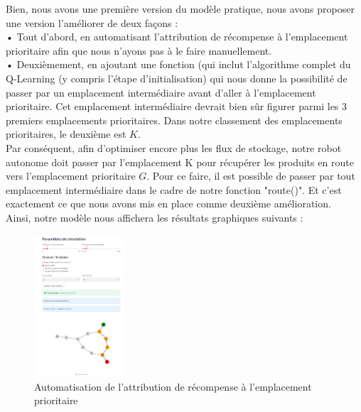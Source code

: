 \documentclass{article}
\begin{document}
Bien, nous avons une première version du modèle pratique, nous avons proposer une version  l'améliorer de deux façons :\\
•	Tout d'abord, en automatisant l'attribution de récompense à l'emplacement prioritaire afin que nous n'ayons pas à le faire manuellement. \\
•	Deuxièmement, en ajoutant une fonction (qui inclut l'algorithme complet du Q-Learning (y compris l'étape d'initialisation) qui nous donne la possibilité de passer
par un emplacement intermédiaire avant d'aller à l'emplacement prioritaire. Cet emplacement intermédiaire devrait bien sûr figurer parmi les 3 premiers emplacements prioritaires. Dans notre classement des emplacements prioritaires, le deuxième est $K$. \\
Par conséquent, afin d'optimiser encore plus les flux de stockage, notre robot autonome doit passer par l'emplacement K pour récupérer les produits en route vers l'emplacement
prioritaire $G$. Pour ce faire, il est possible de passer par tout emplacement intermédiaire dans le cadre de notre fonction "route()". Et c'est exactement ce que nous avons mis en place comme deuxième amélioration.\\
Ainsi, notre modèle  nous affichera les résultats graphiques  suivants :
\begin{figure}[h]
    \centering
    \includegraphics[width=0.3\textwidth]{image5.png} 
    \caption{Automatisation de l'attribution de récompense à l'emplacement prioritaire}
    \label{fig:Automatisation de l'attribution de récompense à l'emplacement prioritaire}
\end{figure}
\end{document}

